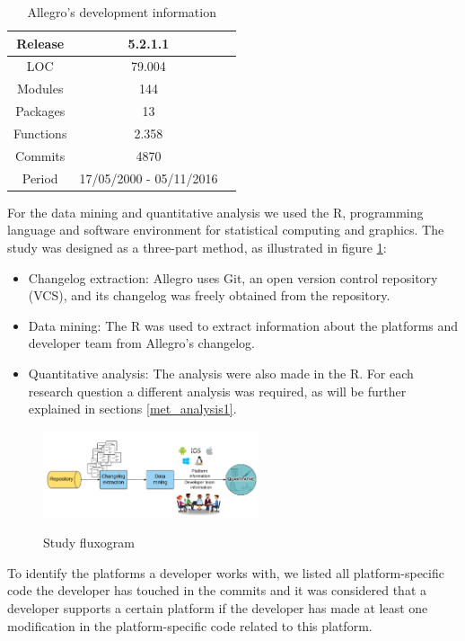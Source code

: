 \documentclass[10pt, conference]{IEEEtran}
\begin{document}
\begin{table}[h]
\renewcommand{\arraystretch}{1.3}
\caption{Allegro’s development information}
\label{allegroinfo}
\centering
\begin{tabular}{|c|c|c|}
\hline
Release & 5.2.1.1\\
\hline
LOC & 79.004 \\
\hline
Modules & 144\\
\hline
Packages & 13\\
\hline
Functions & 2.358\\
\hline
Commits & 4870  \\
\hline
Period & 17/05/2000 - 05/11/2016   \\
\hline
\end{tabular}
\end{table}

For the data mining and quantitative analysis we used the R, programming language and software environment for statistical computing and graphics. The study was designed as a three-part method, as illustrated in figure \ref{metodologia}: 

\begin{itemize}
\item Changelog extraction: Allegro uses Git, an open version control repository (VCS), and its changelog was freely obtained from the repository.
\item  Data mining: The R was used to extract information about the platforms and developer team from Allegro's changelog. 
\item Quantitative analysis: The analysis were also made in the R. For each research question a different analysis was required, as will be further explained in sections \ref{met_analysis1}.
\end{itemize}

\begin{figure}[h]
\centering
\textbf{}\includegraphics[width=2.5in]{metodologia}
\caption{Study fluxogram}
\label{metodologia}
\end{figure}

To identify the platforms a developer works with, we listed all platform-specific code the developer has touched in the commits and it was considered that a developer supports a certain platform if the developer has made at least one modification in the platform-specific code related to this platform.
\end{document}
